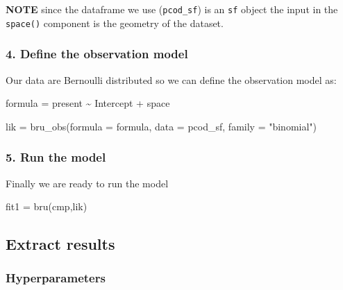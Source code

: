 \documentclass[
  letterpaper,
  DIV=11,
  numbers=noendperiod]{scrartcl}
\newenvironment{Shaded}{\begin{snugshade}}{\end{snugshade}}
\newcommand{\AttributeTok}[1]{\textcolor[rgb]{0.40,0.45,0.13}{#1}}
\newcommand{\FunctionTok}[1]{\textcolor[rgb]{0.28,0.35,0.67}{#1}}
\newcommand{\NormalTok}[1]{\textcolor[rgb]{0.00,0.23,0.31}{#1}}
\newcommand{\OtherTok}[1]{\textcolor[rgb]{0.00,0.23,0.31}{#1}}
\newcommand{\SpecialCharTok}[1]{\textcolor[rgb]{0.37,0.37,0.37}{#1}}
\newcommand{\StringTok}[1]{\textcolor[rgb]{0.13,0.47,0.30}{#1}}
\begin{document}
\textbf{NOTE} since the dataframe we use (\texttt{pcod\_sf}) is an
\texttt{sf} object the input in the \texttt{space()} component is the
geometry of the dataset.

\subsubsection{4. Define the observation
model}\label{define-the-observation-model}

Our data are Bernoulli distributed so we can define the observation
model as:

\begin{Shaded}
\begin{Highlighting}[]
\NormalTok{formula }\OtherTok{=}\NormalTok{ present }\SpecialCharTok{\textasciitilde{}}\NormalTok{ Intercept  }\SpecialCharTok{+}\NormalTok{ space}

\NormalTok{lik }\OtherTok{=} \FunctionTok{bru\_obs}\NormalTok{(}\AttributeTok{formula =}\NormalTok{ formula, }
              \AttributeTok{data =}\NormalTok{ pcod\_sf, }
              \AttributeTok{family =} \StringTok{"binomial"}\NormalTok{)}
\end{Highlighting}
\end{Shaded}

\subsubsection{5. Run the model}\label{run-the-model}

Finally we are ready to run the model

\begin{Shaded}
\begin{Highlighting}[]
\NormalTok{fit1 }\OtherTok{=} \FunctionTok{bru}\NormalTok{(cmp,lik)}
\end{Highlighting}
\end{Shaded}

\subsection{Extract results}\label{extract-results}

\subsubsection{Hyperparameters}\label{hyperparameters}
\end{document}
